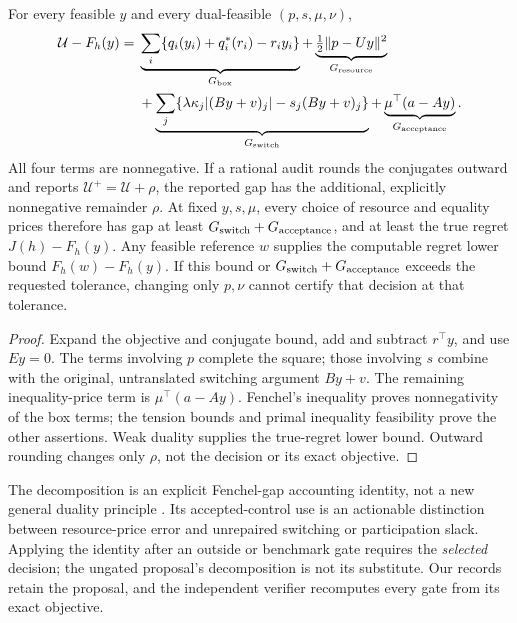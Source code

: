 \begin{theorem}\label{thm:r21-decomposition}
For every feasible $y$ and every dual-feasible $(p,s,\mu,\nu)$,
\begin{align}
 \mathcal U-F_h(y)
 ={}&\underbrace{\sum_i\{q_i(y_i)+q_i^*(r_i)-r_iy_i\}}_{G_{\rm box}}
 +\underbrace{\tfrac12\|p-Uy\|^2}_{G_{\rm resource}}\nonumber\\
 &+\underbrace{\sum_j\{\lambda\kappa_j|(By+v)_j|-s_j(By+v)_j\}}_{G_{\rm switch}}
 +\underbrace{\mu^\top(a-Ay)}_{G_{\rm acceptance}}.\label{eq:r21-components}
\end{align}
All four terms are nonnegative. If a rational audit rounds the conjugates outward and reports $\mathcal U^+=\mathcal U+\rho$, the reported gap has the additional, explicitly nonnegative remainder $\rho$. At fixed $y,s,\mu$, every choice of resource and equality prices therefore has gap at least
$G_{\rm switch}+G_{\rm acceptance}$, and at least the true regret $J(h)-F_h(y)$. Any feasible reference $w$ supplies the computable regret lower bound $F_h(w)-F_h(y)$. If this bound or $G_{\rm switch}+G_{\rm acceptance}$ exceeds the requested tolerance, changing only $p,\nu$ cannot certify that decision at that tolerance.
\end{theorem}
\begin{proof}
Expand the objective and conjugate bound, add and subtract $r^\top y$, and use $Ey=0$. The terms involving $p$ complete the square; those involving $s$ combine with the original, untranslated switching argument $By+v$. The remaining inequality-price term is $\mu^\top(a-Ay)$. Fenchel's inequality proves nonnegativity of the box terms; the tension bounds and primal inequality feasibility prove the other assertions. Weak duality supplies the true-regret lower bound. Outward rounding changes only $\rho$, not the decision or its exact objective.
\end{proof}
The decomposition is an explicit Fenchel-gap accounting identity, not a new general duality principle \citep{BoydVandenberghe2004}. Its accepted-control use is an actionable distinction between resource-price error and unrepaired switching or participation slack. Applying the identity after an outside or benchmark gate requires the \emph{selected} decision; the ungated proposal's decomposition is not its substitute. Our records retain the proposal, and the independent verifier recomputes every gate from its exact objective.

